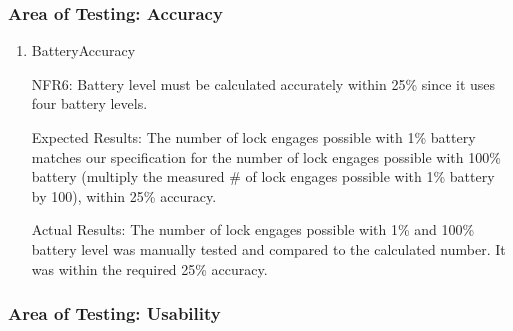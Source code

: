 \documentclass[12pt, titlepage]{article}
\begin{document}
\subsubsection{Area of Testing: Accuracy}

\begin{enumerate}

\item{BatteryAccuracy

NFR6: Battery level must be calculated accurately within 25\% since it uses four battery levels.}

Expected Results: The number of lock engages possible with 1\% battery matches our specification for the number of lock engages possible with 100\% battery (multiply the measured \# of lock engages possible with 1\% battery by 100), within 25\% accuracy.

Actual Results: The number of lock engages possible with 1\% and 100\% battery level was manually tested and compared to the calculated number. It was within the required 25\% accuracy. 

\end{enumerate}

\subsubsection{Area of Testing: Usability}
\end{document}
